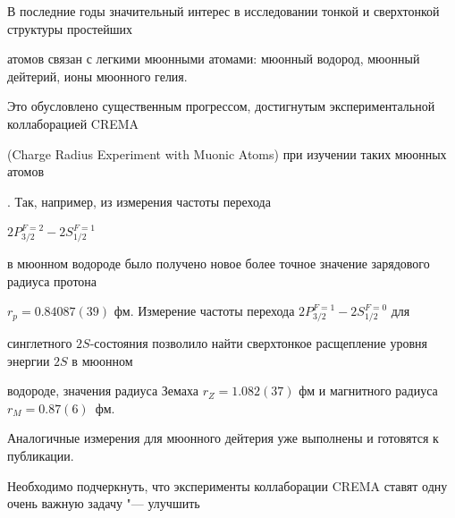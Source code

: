 


\date{17/XII/2014} %

















\makerutitle



\newpage



В последние годы значительный интерес в исследовании тонкой и сверхтонкой структуры простейших

атомов связан с легкими мюонными атомами: мюонный водород, мюонный дейтерий, ионы мюонного гелия.

Это обусловлено существенным прогрессом, достигнутым экспериментальной коллаборацией CREMA

(Charge Radius Experiment with Muonic Atoms) при изучении таких мюонных атомов

\cite{CREMA,CREMA1}. Так, например, из измерения частоты перехода 

$2P^{F=2}_{3/2}-2S^{F=1}_{1/2}$

в мюонном водороде было получено новое более точное значение зарядового радиуса протона

$r_p= 0.84087(39)$ фм. Измерение частоты перехода $2P^{F=1}_{3/2}-2S^{F=0}_{1/2}$ для

синглетного $2S$-состояния позволило найти сверхтонкое расщепление уровня энергии $2S$ в мюонном

водороде, значения радиуса Земаха $r_Z = 1.082(37)$ фм и магнитного радиуса $r_M = 0.87(6)$~фм.

Аналогичные измерения для мюонного дейтерия уже выполнены и готовятся к публикации.

Необходимо подчеркнуть, что эксперименты коллаборации CREMA ставят одну очень важную задачу "--- улучшить

